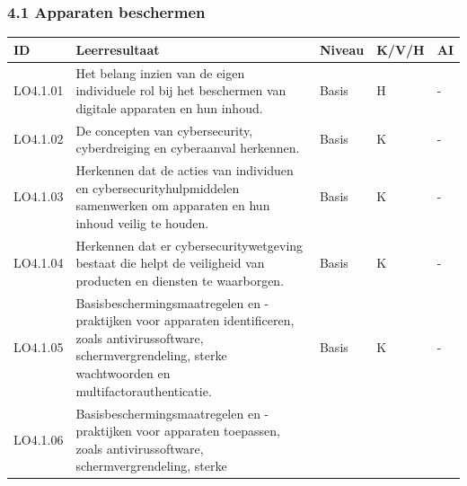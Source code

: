 \documentclass[
  dutch,
  letterpaper,
  DIV=11,
  numbers=noendperiod]{scrartcl}
\begin{document}
\subsubsection{4.1 Apparaten beschermen}\label{apparaten-beschermen}

\begin{longtable}[]{@{}
  >{\centering\arraybackslash}p{}
  >{\centering\arraybackslash}p{}
  >{\centering\arraybackslash}p{}
  >{\centering\arraybackslash}p{}
  >{\centering\arraybackslash}p{}@{}}
\toprule\noalign{}
\begin{minipage}[b]{\linewidth}\centering
ID
\end{minipage} & \begin{minipage}[b]{\linewidth}\centering
Leerresultaat
\end{minipage} & \begin{minipage}[b]{\linewidth}\centering
Niveau
\end{minipage} & \begin{minipage}[b]{\linewidth}\centering
K/V/H
\end{minipage} & \begin{minipage}[b]{\linewidth}\centering
AI
\end{minipage} \\
\midrule\noalign{}
\endhead
\bottomrule\noalign{}
\endlastfoot
LO4.1.01 & Het belang inzien van de eigen individuele rol bij het
beschermen van digitale apparaten en hun inhoud. & Basis & H & - \\
LO4.1.02 & De concepten van cybersecurity, cyberdreiging en cyberaanval
herkennen. & Basis & K & - \\
LO4.1.03 & Herkennen dat de acties van individuen en
cybersecurityhulpmiddelen samenwerken om apparaten en hun inhoud veilig
te houden. & Basis & K & - \\
LO4.1.04 & Herkennen dat er cybersecuritywetgeving bestaat die helpt de
veiligheid van producten en diensten te waarborgen. & Basis & K & - \\
LO4.1.05 & Basisbeschermingsmaatregelen en -praktijken voor apparaten
identificeren, zoals antivirussoftware, schermvergrendeling, sterke
wachtwoorden en multifactorauthenticatie. & Basis & K & - \\
LO4.1.06 & Basisbeschermingsmaatregelen en -praktijken voor apparaten
toepassen, zoals antivirussoftware, schermvergrendeling, sterke

\end{longtable}
\end{document}
